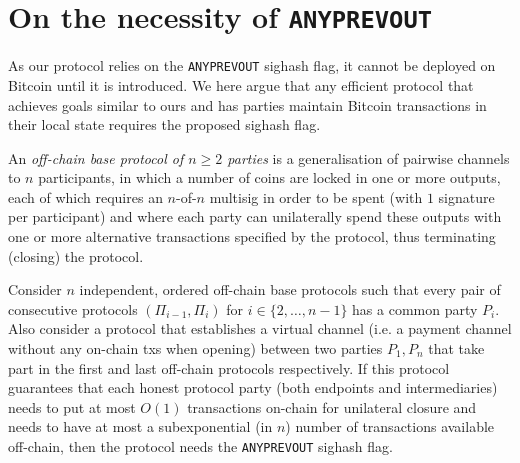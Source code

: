 \section{On the necessity of \texttt{ANYPREVOUT}}
  \label{section:anyprevout}
  As our protocol relies on the \texttt{ANYPREVOUT} sighash flag, it cannot be
  deployed on Bitcoin until it is introduced. We here argue that any efficient
  protocol that achieves goals similar to ours and has parties maintain 
  Bitcoin transactions in their local state requires  the proposed sighash flag. 

  \begin{definition}
    An \emph{off-chain base protocol of $n \geq 2$ parties} is a generalisation
    of pairwise channels to $n$ participants, in which a number of coins are
    locked in one or more outputs, each of which requires an $n$-of-$n$ multisig
    in order to be spent (with $1$ signature per participant) and where each
    party can unilaterally spend these outputs with one or more alternative
    transactions specified by the protocol, thus terminating (closing) the
    protocol.
  \end{definition}

  \begin{theorem}
    \label{theorem:anyprevout}
    Consider $n$ independent, ordered off-chain base protocols
    such that every pair of consecutive protocols $(\Pi_{i-1}, \Pi_i)$ for $i
    \in \{2, \dots, n-1\}$ has a common party $P_i$. Also consider a protocol
    that establishes a virtual channel (i.e. a payment channel without any on-chain
    txs when opening) between two parties $P_1, P_n$ that take part in the first
    and last off-chain protocols respectively. If this protocol guarantees that
    each honest protocol party (both endpoints and intermediaries) needs to put
    at most $O(1)$ transactions on-chain for unilateral closure and needs to
    have at most a subexponential (in $n$) number of transactions  available off-chain,
    then the protocol needs the \texttt{ANYPREVOUT} sighash flag.
  \end{theorem}

